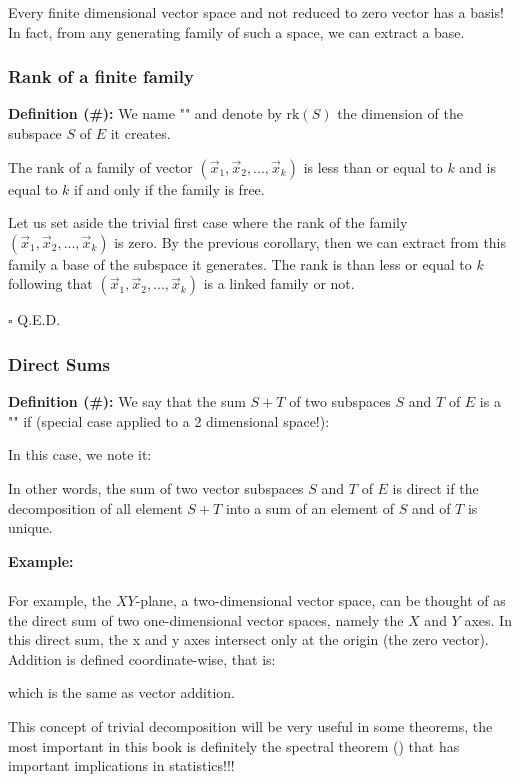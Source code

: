 	Every finite dimensional vector space and not reduced to zero vector has a basis! In fact, from any generating family of such a space, we can extract a base.
	
	\subsubsection{Rank of a finite family}
	\textbf{Definition (\#\mydef):} We name "" and denote by $\text{rk}(S)$ the dimension of the subspace $S$ of $E$ it creates.
	
	\begin{theorem}
	The rank of a family of vector $(\vec{x}_1,\vec{x}_2,...,\vec{x}_k)$ is less than or equal to $k$ and is equal to $k$ if and only if the family is free.
	\end{theorem}
	\begin{dem}
	Let us set aside the trivial first case where the rank of the family $(\vec{x}_1,\vec{x}_2,...,\vec{x}_k)$ is zero. By the previous corollary, then we can extract from this family a base of the subspace it generates. The rank is than less or equal to $k$ following that $(\vec{x}_1,\vec{x}_2,...,\vec{x}_k)$ is a linked family or not.
	\begin{flushright}
		$\square$  Q.E.D.
	\end{flushright}
	\end{dem}
	
	\pagebreak
	\subsubsection{Direct Sums}
	\textbf{Definition (\#\mydef):} We say that the sum $S + T$ of two subspaces $S$ and $T$ of $E$ is a "" if (special case applied to a 2 dimensional space!):
	
	In this case, we note it:
	
	In other words, the sum of two vector subspaces $S$ and $T$ of $E$ is direct if the decomposition of all element $S + T$ into a sum of an element of $S$ and of $T$  is unique.
	
	\begin{tcolorbox}[colframe=black,colback=white,sharp corners]
	\textbf{{\Large {}}Example:}\\\\
	For example, the $XY$-plane, a two-dimensional vector space, can be thought of as the direct sum of two one-dimensional vector spaces, namely the $X$ and $Y$ axes. In this direct sum, the x and y axes intersect only at the origin (the zero vector). Addition is defined coordinate-wise, that is:
	 
	which is the same as vector addition.
	\end{tcolorbox}	
	This concept of trivial decomposition will be very useful in some theorems, the most important in this book is definitely the spectral theorem () that has important implications in statistics!!!
	
